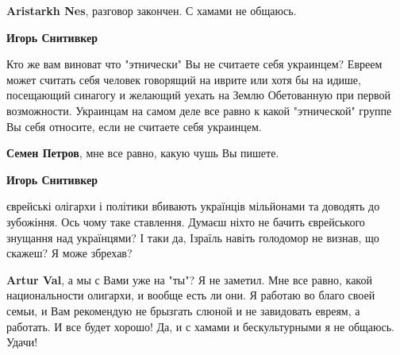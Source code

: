\begin{itemize}
\begin{itemize}
\textbf{Aristarkh Nes}, разговор закончен. С хамами не общаюсь.

 
\textbf{Игорь Снитивкер} 

Кто же вам виноват что "этнически" Вы не считаете себя украинцем? Евреем может
считать себя человек говорящий на иврите или хотя бы на идише, посещающий
синагогу и желающий уехать на Землю Обетованную при первой возможности.
Украинцам на самом деле все равно к какой "этнической" группе Вы себя относите,
если не считаете себя украинцем.


 
\textbf{Семен Петров}, мне все равно, какую чушь Вы пишете.

 
\textbf{Игорь Снитивкер} 

єврейські олігархи і політики вбивають українців мільйонами та доводять до
зубожіння. Ось чому таке ставлення. Думаєш ніхто не бачить єврейського знущання
над українцями? І таки да, Ізраїль навіть голодомор не визнав, що скажеш? Я
може збрехав?

 
\textbf{Artur Val}, а мы с Вами уже на "ты"? Я не заметил. Мне все равно, какой
национальности олигархи, и вообще есть ли они. Я работаю во благо своей семьи,
и Вам рекомендую не брызгать слюной и не завидовать евреям, а работать. И все
будет хорошо! Да, и с хамами и бескультурными я не общаюсь. Удачи!

\end{itemize}


\end{itemize}
